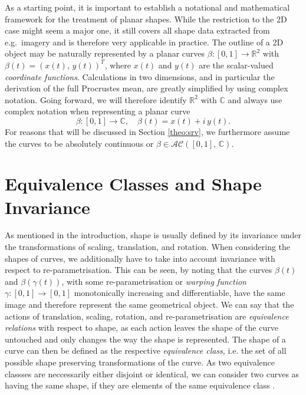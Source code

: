 As a starting point, it is important to establish a notational and mathematical framework for the treatment of planar shapes.
While the restriction to the 2D case might seem a major one, it still covers all shape data extracted from e.g.\ imagery and is therefore very applicable in practice.
The outline of a 2D object may be naturally represented by a planar curves $\beta : [0,1] \rightarrow \mathbb{R}^2$ with $\beta(t) = (x(t),\, y(t))^T$, where $x(t)$ and $y(t)$ are the scalar-valued \textit{coordinate functions}.
Calculations in two dimensions, and in particular the derivation of the full Procrustes mean, are greatly simplified by using complex notation.
Going forward, we will therefore identify $\mathbb{R}^2$ with $\mathbb{C}$ and always use complex notation when representing a planar curve
$$\beta : [0,1] \rightarrow \mathbb{C}, \quad \beta(t) = x(t) + i\, y(t).$$
For reasons that will be discussed in Section \ref{theo:srv}, we furthermore assume the curves to be absolutely continuous or $\beta \in \mathcal{AC}([0,1],\, \mathbb{C})$.



\section{Equivalence Classes and Shape Invariance}
\label{theo:inv}
As mentioned in the introduction, shape is usually defined by its invariance under the transformations of scaling, translation, and rotation.
When considering the shapes of curves, we additionally have to take into account invariance with respect to re-parametrisation.
This can be seen, by noting that the curves $\beta(t)$ and $\beta(\gamma(t))$, with some re-parametrisation or \textit{warping function} $\gamma : [0,1] \rightarrow [0,1]$ monotonically increasing and differentiable, have the same image and therefore represent the same geometrical object.
We can say that the actions of translation, scaling, rotation, and re-parametrisation are \textit{equivalence relations} with respect to shape, as each action leaves the shape of the curve untouched and only changes the way the shape is represented.
The shape of a curve can then be defined as the respective \textit{equivalence class}, i.e. the set of all possible shape preserving transformations of the curve.
As two equivalence classses are neccessarily either disjoint or identical, we can consider two curves as having the same shape, if they are elements of the same equivalence class \parencite[see][40]{SrivastavaKlassen2016}.

